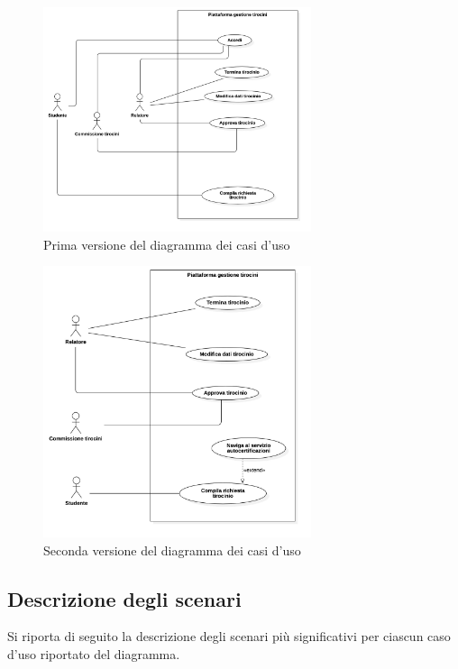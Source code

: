 \documentclass[12pt]{article}
\begin{document}
\begin{figure}[htb!]
   \centering
   \includegraphics[width=0.7\textwidth]{images/UseCaseDiagram1.jpg}
   \caption*{Prima versione del diagramma dei casi d'uso}
\end{figure}

\begin{figure}[htb!]
   \centering
   \includegraphics[width=0.7\textwidth]{images/UseCaseDiagram2.jpg}
   \caption*{Seconda versione del diagramma dei casi d'uso}
\end{figure}

\newpage
\subsection{Descrizione degli scenari}

Si riporta di seguito la descrizione degli scenari più significativi per ciascun caso d'uso riportato del diagramma.
\end{document}
